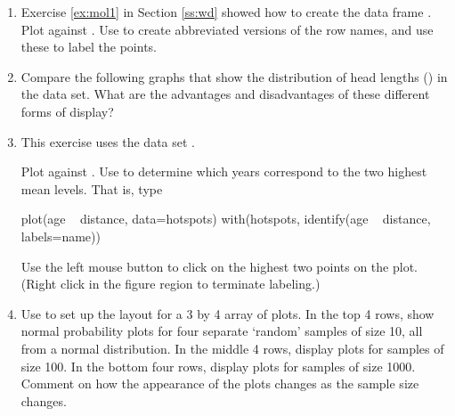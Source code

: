 \begin{enumerate}
\item Exercise \ref{ex:mol1} in Section \ref{ss:wd} showed how to
create the data frame .  Plot 
  against . Use  to create abbreviated
  versions of the row names, and use these to label the
  points.\label{ex:molclock}

\item Compare the following graphs that show the distribution of head
  lengths () in the  data set.
What are the advantages and disadvantages of these different
forms of display?

\item This exercise uses the data set .

Plot  against .  Use  to
determine which years correspond to the two highest mean levels. That
is, type
\begin{Schunk}
\begin{Sinput}
plot(age ~ distance, data=hotspots)
with(hotspots, identify(age ~ distance, labels=name))
\end{Sinput}
\end{Schunk}
Use the left mouse button to click on the highest two points
on the plot. (Right click in the figure region to terminate labeling.)

\item Use  to set up the layout for a 3 by 4 array
of plots. In the top 4 rows, show normal probability plots
for four separate `random' samples of size 10, all from
a normal distribution. In the middle 4 rows, display plots for
samples of size 100. In the bottom four rows, display plots for
samples of size 1000. Comment on how the appearance of the plots
changes as the sample size changes.


\end{enumerate}
